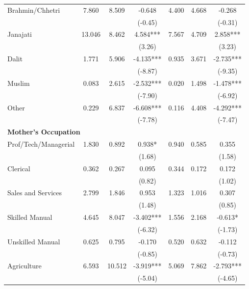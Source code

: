 \begin{table}[htbp]
\begin{tabular}{lcccccc}
\hspace{0.2in}Brahmin/Chhetri & 7.860 & 8.509 & -0.648 & 4.400 & 4.668 & -0.268 \\
 & & & (-0.45) & & & (-0.31) \\
\hspace{0.2in}Janajati & 13.046 & 8.462 & 4.584*** & 7.567 & 4.709 & 2.858*** \\
 & & & (3.26) & & & (3.23) \\
\hspace{0.2in}Dalit & 1.771 & 5.906 & -4.135*** & 0.935 & 3.671 & -2.735*** \\
 & & & (-8.87) & & & (-9.35) \\
\hspace{0.2in}Muslim & 0.083 & 2.615 & -2.532*** & 0.020 & 1.498 & -1.478*** \\
 & & & (-7.90) & & & (-6.92) \\
\hspace{0.2in}Other & 0.229 & 6.837 & -6.608*** & 0.116 & 4.408 & -4.292*** \\
 & & & (-7.78) & & & (-7.47) \\
\multicolumn{7}{l}{\textbf{Mother's Occupation}} \\
\hspace{0.2in}Prof/Tech/Managerial & 1.830 & 0.892 & 0.938* & 0.940 & 0.585 & 0.355 \\
 & & & (1.68) & & & (1.58) \\
\hspace{0.2in}Clerical & 0.362 & 0.267 & 0.095 & 0.344 & 0.172 & 0.172 \\
 & & & (0.82) & & & (1.02) \\
\hspace{0.2in}Sales and Services & 2.799 & 1.846 & 0.953 & 1.323 & 1.016 & 0.307 \\
 & & & (1.48) & & & (0.85) \\
\hspace{0.2in}Skilled Manual & 4.645 & 8.047 & -3.402*** & 1.556 & 2.168 & -0.613* \\
 & & & (-6.32) & & & (-1.73) \\
\hspace{0.2in}Unskilled Manual & 0.625 & 0.795 & -0.170 & 0.520 & 0.632 & -0.112 \\
 & & & (-0.85) & & & (-0.73) \\
\hspace{0.2in}Agriculture & 6.593 & 10.512 & -3.919*** & 5.069 & 7.862 & -2.793*** \\
 & & & (-5.04) & & & (-4.65) \\

\end{tabular}
\end{table}
